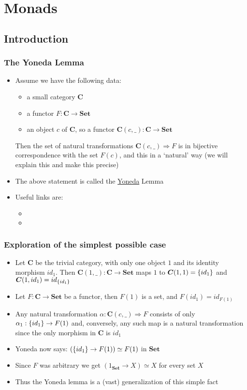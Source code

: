 \documentclass[handout]{beamer}
\title[INF223 presentations]{}
\newcommand{\To}{\Rightarrow}
\newcommand{\bfsf}[1]{{\boldsymbol{#1}}}
\newcommand{\Set}{\bfsf{Set}}
\newcommand{\CC}{\bfsf{C}}
\begin{document}
\section{Monads}
\subsection{Introduction}
 
\frame
  {   
    \frametitle{The Yoneda Lemma}\label{Yon:Intro}

 \begin{itemize}[<+->]
\item Assume we have the following data:
\begin{itemize}
    \item a small category $\CC$
    \item a functor $F:\CC\to\Set$
    \item an object $c$ of $\CC$, so a functor $\CC(c,\_):\CC\to\Set$
 \end{itemize}
Then the set of natural transformations $\CC(c,\_)\To F$ is in bijective
correspondence with the set $F(c)$, and this in a `natural' way
(we will explain this and make this precise)
\item The above statement is called the 
\href{https://en.wikipedia.org/wiki/Nobuo_Yoneda}{\color{blue}Yoneda} Lemma
\item Useful links are:
 \begin{itemize}
    \item {}
    \item {}
 \end{itemize}
 \end{itemize}

 }

\frame
  {   
    \frametitle{Exploration of the simplest possible case}\label{Yon:Triv}

 \begin{itemize}[<+->]
\item Let $\CC$ be the trivial category, with only one object $1$ and
 its identity morphism $id_1$. Then $\CC(1,\_):\CC\to\Set$ maps
$1$ to $\CC(1,1) = \set{id_1}$ and $\CC(1,id_1) = id_{\set{id_1}}$
\item Let $F:\CC\to\Set$ be a functor, then $F(1)$ is a set, and
$F(id_1) = id_{F(1)}$
\item Any natural transformation $\alpha: \CC(c,\_)\To F$ consists of
only $\alpha_1: \{id_1\} \to F(1)$ and,
conversely, any such map is a natural transformation
since the only morphism in $\CC$ is $id_1$
\item Yoneda now says:  $(\{id_1\} \to F(1)) \simeq F(1)$ in $\Set$
\item Since $F$ was arbitrary we get  $(1_\Set \to X) \simeq X$ for every set $X$
\item Thus the Yoneda lemma is a (vast) generalization of this simple fact
 \end{itemize}

 }
\end{document}
